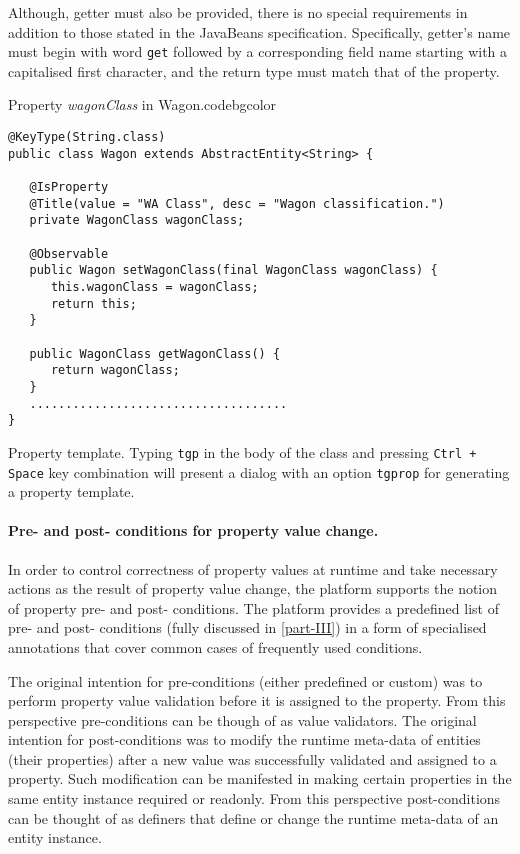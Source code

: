   Although, getter must also be provided, there is no special requirements in addition to those stated in the JavaBeans specification.
  Specifically, getter's name must begin with word \texttt{get} followed by a corresponding field name starting with a capitalised first character, and the return type must match that of the property.

  \begin{code}{Property \emph{wagonClass} in Wagon.}{\label{lst:WagonWagonClassProperty}}{codebgcolor}
    \begin{lstlisting}
@KeyType(String.class)
public class Wagon extends AbstractEntity<String> {

   @IsProperty
   @Title(value = "WA Class", desc = "Wagon classification.")
   private WagonClass wagonClass;

   @Observable
   public Wagon setWagonClass(final WagonClass wagonClass) {
      this.wagonClass = wagonClass;
      return this;
   }
  
   public WagonClass getWagonClass() {
      return wagonClass;
   }
   ....................................
}
    \end{lstlisting}
  \end{code}


  \begin{notebox}{Property template.}{\label{nb:EclipseTemplatesForProperty}}
    Typing \texttt{tgp} in the body of the class and pressing \texttt{Ctrl + Space} key combination will present a dialog with an option \texttt{tgprop} for generating a property template.
  \end{notebox}

  \paragraph*{Pre- and post- conditions for property value change.}
  
  In order to control correctness of property values at runtime and take necessary actions as the result of property value change, the platform supports the notion of property pre- and post- conditions.
  The platform provides a predefined list of pre- and post- conditions (fully discussed in \ref{part-III}) in a form of specialised annotations that cover common cases of frequently used conditions.
  
  The original intention for pre-conditions (either predefined or custom) was to perform property value validation before it is assigned to the property.
  From this perspective pre-conditions can be though of as value validators.
  The original intention for post-conditions was to modify the runtime meta-data of entities (their properties) after a new value was successfully validated and assigned to a property.
  Such modification can be manifested in making certain properties in the same entity instance required or readonly.
  From this perspective post-conditions can be thought of as definers that define or change the runtime meta-data of an entity instance.
  

